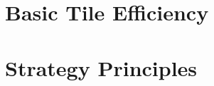 \documentclass{book}
\begin{document}




\part{Basic Tile Efficiency} \label{part:tile}






\part{Strategy Principles} \label{part:strat}








\begin{appendices}
\appendixpage \noappendicestocpagenum \addappheadtotoc




\end{appendices}

{\small \printindex}

\thispagestyle{empty}
\mbox{}\newpage
\thispagestyle{empty}
\mbox{}\newpage
\end{document}
